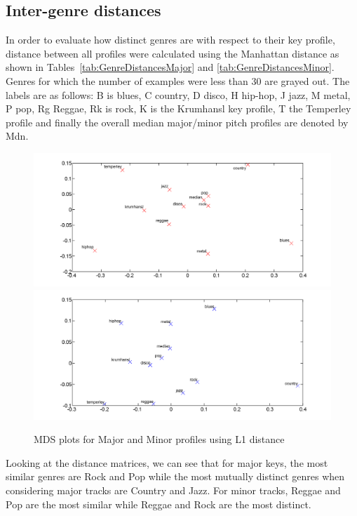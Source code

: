 \documentclass{article}
\begin{document}
\subsection{Inter-genre distances}
In order to evaluate how distinct genres are with respect to their key profile, distance between all profiles were calculated using the Manhattan distance as shown in Tables~\ref{tab:GenreDistancesMajor} and \ref{tab:GenreDistancesMinor}. Genres for which the number of examples were less than 30 are grayed out. The labels are as follows: B is blues, C country, D disco, H hip-hop, J jazz, M metal, P pop, Rg Reggae, Rk is rock, K is the Krumhansl key profile, T the Temperley profile \cite{temperley_tonal_2007} and finally the overall median major/minor pitch profiles are denoted by Mdn.

\begin{figure}
    \includegraphics[scale=.2]{graph/MDS_maj_colour}
    \includegraphics[scale=.2]{graph/MDS_min_colour}
	\caption{MDS plots for Major and Minor profiles using L1 distance}
	\label{fig:MDS}
\end{figure}

Looking at the distance matrices, we can see that for major keys, the most similar genres are Rock and Pop while the most mutually distinct genres when considering major tracks are Country and Jazz. For minor tracks, Reggae and Pop are the most similar while Reggae and Rock are the most distinct.
\end{document}
